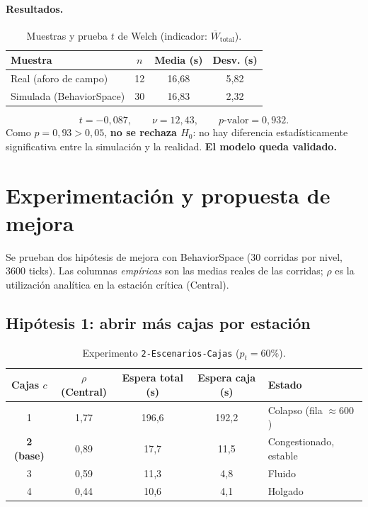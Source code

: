 \documentclass[11pt,a4paper]{article}
\newcommand{\code}[1]{\texttt{#1}}
\begin{document}
\paragraph{Resultados.}
\begin{table}[h]
\centering
\caption{Muestras y prueba $t$ de Welch (indicador: $\overline{W}_{\text{total}}$).}
\label{tab:validacion}
\begin{tabular}{lccc}
\toprule
Muestra & $n$ & Media (s) & Desv. (s) \\
\midrule
Real (aforo de campo) & 12 & 16{,}68 & 5{,}82 \\
Simulada (BehaviorSpace) & 30 & 16{,}83 & 2{,}32 \\
\bottomrule
\end{tabular}
\end{table}

\[
t = -0{,}087,\qquad \nu = 12{,}43,\qquad p\text{-valor} = 0{,}932.
\]
Como $p = 0{,}93 > 0{,}05$, \textbf{no se rechaza $H_0$}: no hay diferencia
estadísticamente significativa entre la simulación y la realidad. \textbf{El modelo
queda validado.}

\section{Experimentación y propuesta de mejora}

Se prueban dos hipótesis de mejora con BehaviorSpace (30 corridas por nivel, 3600
ticks). Las columnas \emph{empíricas} son las medias reales de las corridas; $\rho$
es la utilización analítica en la estación crítica (Central).

\subsection{Hipótesis 1: abrir más cajas por estación}
\begin{table}[h]
\centering
\caption{Experimento \code{2-Escenarios-Cajas} ($p_t = 60\%$).}
\label{tab:cajas}
\begin{tabular}{ccccl}
\toprule
Cajas $c$ & $\rho$ (Central) & Espera total (s) & Espera caja (s) & Estado \\
\midrule
1 & 1{,}77 & 196{,}6 & 192{,}2 & Colapso (fila $\approx 600$) \\
\textbf{2 (base)} & 0{,}89 & 17{,}7 & 11{,}5 & Congestionado, estable \\
3 & 0{,}59 & 11{,}3 & 4{,}8 & Fluido \\
4 & 0{,}44 & 10{,}6 & 4{,}1 & Holgado \\
\bottomrule
\end{tabular}
\end{table}
\end{document}
